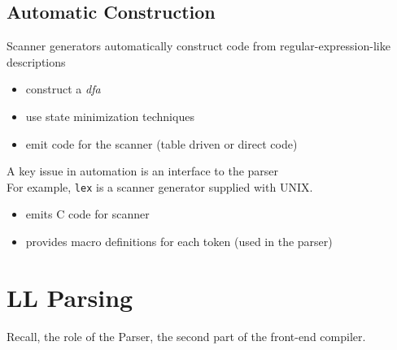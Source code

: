 \documentclass[10pt]{article}
\begin{document}
\subsection*{Automatic Construction}
Scanner generators automatically construct code from regular-expression-like descriptions
\begin{itemize}
    \item construct a \textit{dfa}
    \item use state minimization techniques
    \item emit code for the scanner (table driven or direct code)
\end{itemize}
A key issue in automation is an interface to the parser\\
For example, \texttt{lex} is a scanner generator supplied with UNIX.
\begin{itemize}
    \item emits C code for scanner
    \item provides macro definitions for each token (used in the parser)
\end{itemize}

\section*{LL Parsing}
Recall, the role of the Parser, the second part of the front-end compiler.
\end{document}
